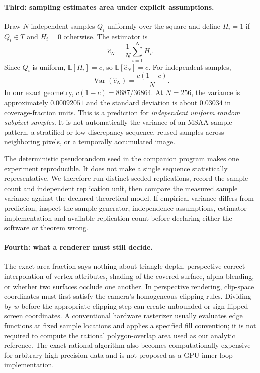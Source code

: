 \paragraph{Third: sampling estimates area under explicit assumptions.}
Draw \(N\) independent samples \(Q_i\) uniformly over the square
and define \(H_i=1\) if \(Q_i\in T\) and \(H_i=0\) otherwise.
The estimator is
\[
\widehat c_N=\frac1N\sum_{i=1}^NH_i.
\]
Since \(Q_i\) is uniform, \(\mathbb E[H_i]=c\), so
\(\mathbb E[\widehat c_N]=c\).
For independent samples,
\[
\operatorname{Var}(\widehat c_N)
=\frac{c(1-c)}{N}.
\]
In our exact geometry,
\(c(1-c)=8687/36864\).
At \(N=256\), the variance is approximately
\(0.00092051\) and the standard deviation is about
\(0.03034\) in coverage-fraction units. This is a prediction
for \emph{independent uniform random subpixel samples}.
It is not automatically the variance of an MSAA sample pattern,
a stratified or low-discrepancy sequence, reused samples
across neighboring pixels, or a temporally accumulated image.

The deterministic pseudorandom seed in the companion program
makes one experiment reproducible. It does not make a single
sequence statistically representative. We therefore run
distinct seeded replications, record the sample count and
independent replication unit, then compare the measured
sample variance against the declared theoretical model.
If empirical variance differs from prediction, inspect the
sample generator, independence assumptions, estimator
implementation and available replication count before
declaring either the software or theorem wrong.

\paragraph{Fourth: what a renderer must still decide.}
The exact area fraction says nothing about triangle depth,
perspective-correct interpolation of vertex attributes,
shading of the covered surface, alpha blending, or whether
two surfaces occlude one another. In perspective rendering,
clip-space coordinates must first satisfy the camera's
homogeneous clipping rules. Dividing by \(w\) before the
appropriate clipping step can create unbounded or sign-flipped
screen coordinates. A conventional hardware rasterizer usually
evaluates edge functions at fixed sample locations and applies
a specified fill convention; it is not required to compute
the rational polygon-overlap area used as our analytic reference.
The exact rational algorithm also becomes computationally
expensive for arbitrary high-precision data and is not proposed
as a GPU inner-loop implementation.

